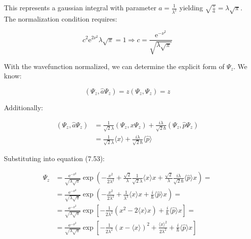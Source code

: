 \documentclass[italian]{HKNdocument}
\begin{document}
This represents a gaussian integral with parameter $a=\frac{1}{\lambda^{2}}$ yielding $\sqrt{\frac{\pi}{a}}=\lambda \sqrt{\pi}$. The normalization condition requires:

\begin{equation*}
c^{2} \mathrm{e}^{2 \nu^{2}} \lambda \sqrt{\pi}=1 \Longrightarrow c=\frac{\mathrm{e}^{-\nu^{2}}}{\sqrt{\lambda \sqrt{\pi}}} \tag{7.58}
\end{equation*}

With the wavefunction normalized, we can determine the explicit form of $\Psi_{z}$. We know:

\begin{equation*}
\left(\Psi_{z}, \hat{a} \Psi_{z}\right)=z\left(\Psi_{z}, \Psi_{z}\right)=z \tag{7.59}
\end{equation*}

Additionally:

\begin{align*}
\left(\Psi_{z}, \hat{a} \Psi_{z}\right) & =\frac{1}{\sqrt{2} \lambda}\left(\Psi_{z}, x \Psi_{z}\right)+\frac{i \lambda}{\sqrt{2} \hbar}\left(\Psi_{z}, \hat{p} \Psi_{z}\right)  \tag{7.60}\\
& =\frac{1}{\sqrt{2} \lambda}\langle x\rangle+\frac{i \lambda}{\sqrt{2} \hbar}\langle\hat{p}\rangle
\end{align*}

Substituting into equation (7.53):

\begin{align*}
\Psi_{z} & =\frac{\mathrm{e}^{-\nu^{2}}}{\sqrt{\lambda \sqrt{\pi}}} \exp \left(-\frac{x^{2}}{2 \lambda^{2}}+\frac{\sqrt{2}}{\lambda} \frac{1}{\sqrt{2} \lambda}\langle x\rangle x+\frac{\sqrt{2}}{\lambda} \frac{i \lambda}{\sqrt{2} \hbar}\langle\hat{p}\rangle x\right)= \\
& =\frac{\mathrm{e}^{-\nu^{2}}}{\sqrt{\lambda \sqrt{\pi}}} \exp \left(-\frac{x^{2}}{2 \lambda^{2}}+\frac{1}{\lambda^{2}}\langle x\rangle x+\frac{i}{\hbar}\langle\hat{p}\rangle x\right)= \\
& =\frac{\mathrm{e}^{-\nu^{2}}}{\sqrt{\lambda \sqrt{\pi}}} \exp \left[-\frac{1}{2 \lambda^{2}}\left(x^{2}-2\langle x\rangle x\right)+\frac{i}{\hbar}\langle\hat{p}\rangle x\right]=  \tag{7.61}\\
& =\frac{\mathrm{e}^{-\nu^{2}}}{\sqrt{\lambda \sqrt{\pi}}} \exp \left[-\frac{1}{2 \lambda^{2}}(x-\langle x\rangle)^{2}+\frac{\langle x\rangle^{2}}{2 \lambda^{2}}+\frac{i}{\hbar}\langle\hat{p}\rangle x\right]
\end{align*}
\end{document}
